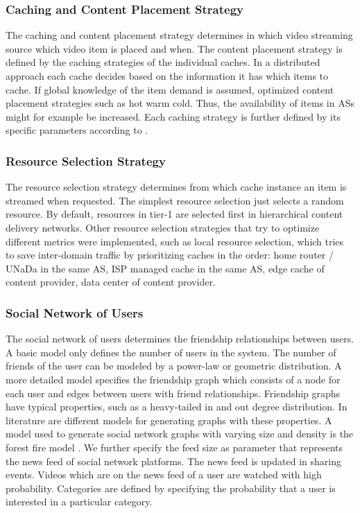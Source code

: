 \subsubsection{Caching and Content Placement Strategy}
The caching and content placement strategy determines in which video streaming source which video item is placed and when.
The content placement strategy is defined by the caching strategies of the individual caches.
In a distributed approach each cache decides based on the information it has which items to cache.
If global knowledge of the item demand is assumed, optimized content placement strategies such as hot warm cold.
Thus, the availability of items in ASs might for example be increased.
Each caching strategy is further defined by its specific parameters according to .

\subsubsection{Resource Selection Strategy}
The resource selection strategy determines from which cache instance an item is streamed when requested.
The simplest resource selection just selects a random resource.
By default, resources in tier-1 are selected first in hierarchical content delivery networks.
Other resource selection strategies that try to optimize different metrics were implemented, such as local resource selection, which tries to save inter-domain traffic by prioritizing caches in the order: home router / UNaDa in the same AS, ISP managed cache in the same AS, edge cache of content provider, data center of content provider.

\subsubsection{Social Network of Users}
The social network of users determines the friendship relationships between users. A basic model only defines the number of users in the system.
The number of friends of the user can be modeled by a power-law or geometric distribution.
A more detailed model specifies the friendship graph which consists of a node for each user and edges between users with friend relationships.
Friendship graphs have typical properties, such as a heavy-tailed in and out degree distribution.
In literature are different models for generating graphs with these properties.
A model used to generate social network graphs with varying size and density is the forest fire model \cite{}.
We further specify the feed size as parameter that represents the news feed of social network platforms.
The news feed is updated in sharing events.
Videos which are on the news feed of a user are watched with high probability.
Categories are defined by specifying the probability that a user is interested in a particular category.

